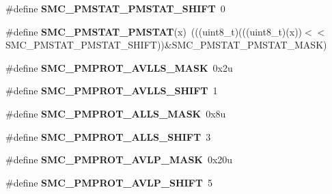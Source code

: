 \begin{DoxyCompactItemize}
\item 
\#define {\bfseries S\+M\+C\+\_\+\+P\+M\+S\+T\+A\+T\+\_\+\+P\+M\+S\+T\+A\+T\+\_\+\+S\+H\+I\+FT}~0\hypertarget{group__SMC__Register__Masks_gaa4083ab43677e6a1b6832f6607a5ef0e}{}\label{group__SMC__Register__Masks_gaa4083ab43677e6a1b6832f6607a5ef0e}

\item 
\#define {\bfseries S\+M\+C\+\_\+\+P\+M\+S\+T\+A\+T\+\_\+\+P\+M\+S\+T\+AT}(x)~(((uint8\+\_\+t)(((uint8\+\_\+t)(x))$<$$<$S\+M\+C\+\_\+\+P\+M\+S\+T\+A\+T\+\_\+\+P\+M\+S\+T\+A\+T\+\_\+\+S\+H\+I\+FT))\&S\+M\+C\+\_\+\+P\+M\+S\+T\+A\+T\+\_\+\+P\+M\+S\+T\+A\+T\+\_\+\+M\+A\+SK)\hypertarget{group__SMC__Register__Masks_ga27d1d3c05772950ce55e5ad4d2a998e3}{}\label{group__SMC__Register__Masks_ga27d1d3c05772950ce55e5ad4d2a998e3}

\item 
\#define {\bfseries S\+M\+C\+\_\+\+P\+M\+P\+R\+O\+T\+\_\+\+A\+V\+L\+L\+S\+\_\+\+M\+A\+SK}~0x2u\hypertarget{group__SMC__Register__Masks_ga62e9f3c7e74a3e5b80b0fae8a896640d}{}\label{group__SMC__Register__Masks_ga62e9f3c7e74a3e5b80b0fae8a896640d}

\item 
\#define {\bfseries S\+M\+C\+\_\+\+P\+M\+P\+R\+O\+T\+\_\+\+A\+V\+L\+L\+S\+\_\+\+S\+H\+I\+FT}~1\hypertarget{group__SMC__Register__Masks_gad625b387a627eb3a69f3a26edc0096b8}{}\label{group__SMC__Register__Masks_gad625b387a627eb3a69f3a26edc0096b8}

\item 
\#define {\bfseries S\+M\+C\+\_\+\+P\+M\+P\+R\+O\+T\+\_\+\+A\+L\+L\+S\+\_\+\+M\+A\+SK}~0x8u\hypertarget{group__SMC__Register__Masks_ga79d87e312be895d4f2bdfdda8c947600}{}\label{group__SMC__Register__Masks_ga79d87e312be895d4f2bdfdda8c947600}

\item 
\#define {\bfseries S\+M\+C\+\_\+\+P\+M\+P\+R\+O\+T\+\_\+\+A\+L\+L\+S\+\_\+\+S\+H\+I\+FT}~3\hypertarget{group__SMC__Register__Masks_gac6cb1305b9cb329a8bb903036893db11}{}\label{group__SMC__Register__Masks_gac6cb1305b9cb329a8bb903036893db11}

\item 
\#define {\bfseries S\+M\+C\+\_\+\+P\+M\+P\+R\+O\+T\+\_\+\+A\+V\+L\+P\+\_\+\+M\+A\+SK}~0x20u\hypertarget{group__SMC__Register__Masks_ga30602dafb393b5d9c52f0c75e1d78210}{}\label{group__SMC__Register__Masks_ga30602dafb393b5d9c52f0c75e1d78210}

\item 
\#define {\bfseries S\+M\+C\+\_\+\+P\+M\+P\+R\+O\+T\+\_\+\+A\+V\+L\+P\+\_\+\+S\+H\+I\+FT}~5\hypertarget{group__SMC__Register__Masks_gae13777e671c1caf2d10809999574fed4}{}\label{group__SMC__Register__Masks_gae13777e671c1caf2d10809999574fed4}


\end{DoxyCompactItemize}
